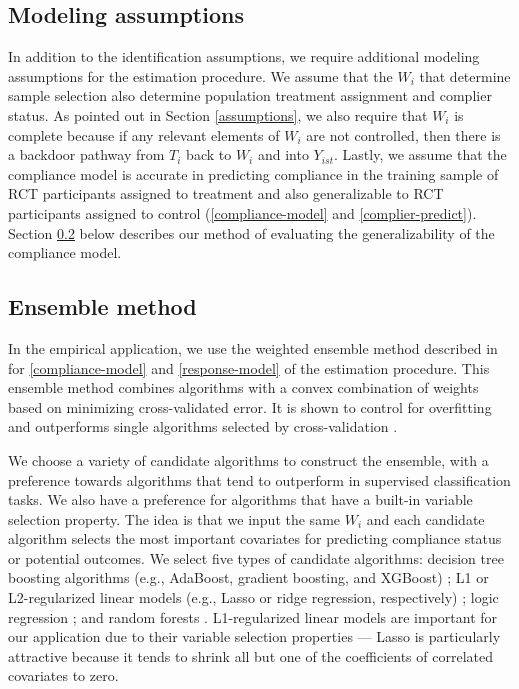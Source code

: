 \documentclass[hidelinks,12pt]{article}
\begin{document}
{{\subsection{Modeling assumptions}  \label{modeling-assumptions}
}
In addition to the identification assumptions, we require additional modeling assumptions for the estimation procedure. We assume that the $W_i$ that determine sample selection also determine population treatment assignment and complier status. As pointed out in Section \ref{assumptions}, we also require that $W_i$ is complete because if any relevant elements of $W_i$ are not controlled, then there is a backdoor pathway from $T_i$ back to $W_i$ and into $Y_{ist}$. Lastly, we assume that the compliance model is accurate in predicting compliance in the training sample of RCT participants assigned to treatment and also generalizable to RCT participants assigned to control (\ref{compliance-model} and \ref{complier-predict}). Section \ref{ensemble} below describes our method of evaluating the generalizability of the compliance model.

{\color{red}
\subsection{Ensemble method}  \label{ensemble}
}

In the empirical application, we use the weighted ensemble method described in \citet{van2007} for \ref{compliance-model} and \ref{response-model} of the estimation procedure. This ensemble method combines algorithms with a convex combination of weights based on minimizing cross-validated error. It is shown to control for overfitting and outperforms single algorithms selected by cross-validation \citep{polley2010super}. 

We choose a variety of candidate algorithms to construct the ensemble, with a preference towards algorithms that tend to outperform in supervised classification tasks. We also have a preference for algorithms that have a built-in variable selection property. The idea is that we input the same $W_i$ and each candidate algorithm selects the most important covariates for predicting compliance status or potential outcomes. We select five types of candidate algorithms: decision tree boosting algorithms (e.g., AdaBoost, gradient boosting, and XGBoost) \citep{freund1996experiments,friedman2000additive,friedman2001greedy}; L1 or L2-regularized linear models (e.g., Lasso or ridge regression, respectively) \citep{tibshirani2012strong}; logic regression \citep{ruczinski2003logic}; and random forests \citep{breiman2001}. L1-regularized linear models are important for our application due to their variable selection properties --- Lasso is particularly attractive because it tends to shrink all but one of the coefficients of correlated covariates to zero. 

}
\end{document}
